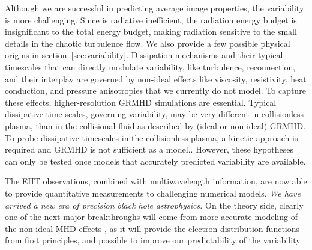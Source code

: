 Although we are successful in predicting average image properties, the
variability is more challenging.
Since \sgra is radiative inefficient, the radiation energy budget is
insignificant to the total energy budget, making radiation sensitive
to the small details in the chaotic turbulence flow.
We also provide a few possible physical origins in
section~\ref{sec:variability}. {Dissipation mechanisms and their typical timescales that can directly modulate variability, like turbulence, reconnection, and their interplay are governed by non-ideal effects like viscosity, resistivity, heat conduction, and pressure anisotropies that we currently do not model. To capture these effects, higher-resolution GRMHD simulations are essential.}
{Typical dissipative time-scales, governing variability, may be very different in collisionless plasma, than in the collisional fluid as described by (ideal or non-ideal) GRMHD. To probe dissipative timescales in the collisionless plasma, a kinetic approach is required and GRMHD is not sufficient as a model.}.
However, these hypotheses can only be tested once models that
accurately predicted variability are available.

The EHT observations, combined with multiwavelength information, are
now able to provide quantitative measurements to challenging numerical
models.
\emph{We have arrived a new era of precision black hole astrophysics.}
On the theory side, clearly one of the next major breakthroughs will
come from more accurate modeling of the non-ideal MHD effects , as it will
provide the electron distribution functions from first principles, and
possible to improve our predictability of the variability.